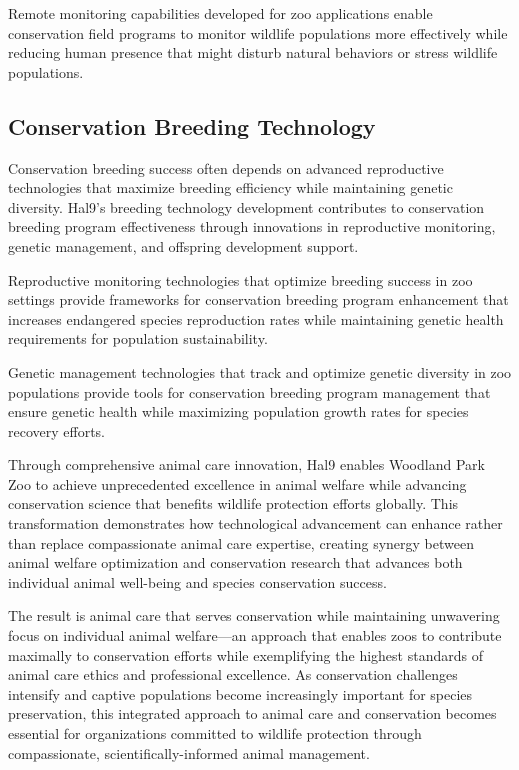\documentclass[
  Letterpaper,
]{scrbook}
\begin{document}
Remote monitoring capabilities developed for zoo applications enable
conservation field programs to monitor wildlife populations more
effectively while reducing human presence that might disturb natural
behaviors or stress wildlife populations.

\subsection{Conservation Breeding
Technology}\label{conservation-breeding-technology}

Conservation breeding success often depends on advanced reproductive
technologies that maximize breeding efficiency while maintaining genetic
diversity. Hal9's breeding technology development contributes to
conservation breeding program effectiveness through innovations in
reproductive monitoring, genetic management, and offspring development
support.

Reproductive monitoring technologies that optimize breeding success in
zoo settings provide frameworks for conservation breeding program
enhancement that increases endangered species reproduction rates while
maintaining genetic health requirements for population sustainability.

Genetic management technologies that track and optimize genetic
diversity in zoo populations provide tools for conservation breeding
program management that ensure genetic health while maximizing
population growth rates for species recovery efforts.

Through comprehensive animal care innovation, Hal9 enables Woodland Park
Zoo to achieve unprecedented excellence in animal welfare while
advancing conservation science that benefits wildlife protection efforts
globally. This transformation demonstrates how technological advancement
can enhance rather than replace compassionate animal care expertise,
creating synergy between animal welfare optimization and conservation
research that advances both individual animal well-being and species
conservation success.

The result is animal care that serves conservation while maintaining
unwavering focus on individual animal welfare---an approach that enables
zoos to contribute maximally to conservation efforts while exemplifying
the highest standards of animal care ethics and professional excellence.
As conservation challenges intensify and captive populations become
increasingly important for species preservation, this integrated
approach to animal care and conservation becomes essential for
organizations committed to wildlife protection through compassionate,
scientifically-informed animal management.
\end{document}
